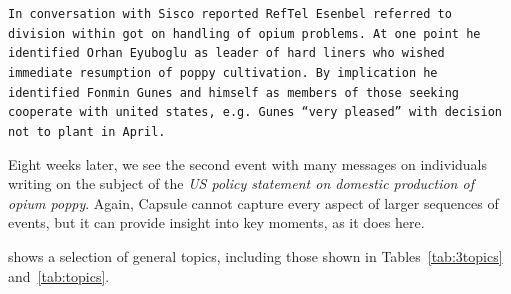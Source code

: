 \begin{shaded*}
\tt{In conversation with Sisco reported RefTel Esenbel referred
to division within got on handling of opium problems.  At
one point he identified Orhan Eyuboglu as leader of hard
liners who wished immediate resumption of poppy cultivation.  
By implication he identified Fonmin Gunes and
himself as members of those seeking cooperate with united
states, e.g. Gunes ``very pleased'' with decision not to
plant in April.}
\end{shaded*}
Eight weeks later, we see the second event with many messages on individuals writing on the subject of the \emph{US policy statement on domestic production of opium poppy}.  Again, Capsule cannot capture every aspect of larger sequences of events, but it can provide insight into key moments, as it does here.

 shows a selection of general topics, including those shown in Tables~\ref{tab:3topics} and~\ref{tab:topics}.


